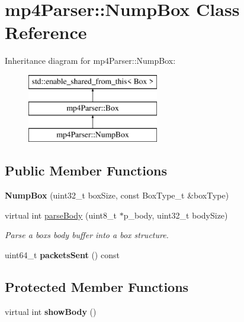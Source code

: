 \hypertarget{classmp4_parser_1_1_nump_box}{}\section{mp4\+Parser\+::Nump\+Box Class Reference}
\label{classmp4_parser_1_1_nump_box}
Inheritance diagram for mp4\+Parser\+::Nump\+Box\+:\begin{figure}[H]
\begin{center}
\leavevmode
\includegraphics[height=3.000000cm]{classmp4_parser_1_1_nump_box}
\end{center}
\end{figure}
\subsection*{Public Member Functions}
\begin{DoxyCompactItemize}
\item 
\mbox{\label{classmp4_parser_1_1_nump_box_ad4139d74bf5505b270e9f9eb86e7cfdc}} 
{\bfseries Nump\+Box} (uint32\+\_\+t box\+Size, const Box\+Type\+\_\+t \&box\+Type)
\item 
virtual int \mbox{\hyperlink{classmp4_parser_1_1_nump_box_abbbb17a66d56147ad973631118f0a0ed}{parse\+Body}} (uint8\+\_\+t $\ast$p\+\_\+body, uint32\+\_\+t body\+Size)
\begin{DoxyCompactList}\small\item\em Parse a box\textquotesingle{}s body buffer into a box structure. \end{DoxyCompactList}\item 
\mbox{\label{classmp4_parser_1_1_nump_box_ada54220e8e6b9af62c24a4bde12e0fbe}} 
uint64\+\_\+t {\bfseries packets\+Sent} () const
\end{DoxyCompactItemize}
\subsection*{Protected Member Functions}
\begin{DoxyCompactItemize}
\item 
\mbox{\label{classmp4_parser_1_1_nump_box_a3e82f17d020b1ea393014ca62cbae937}} 
virtual int {\bfseries show\+Body} ()
\end{DoxyCompactItemize}
